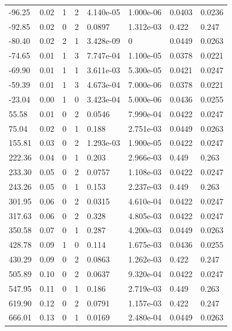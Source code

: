 \documentclass[preview]{standalone}
\begin{document}
{{\begin{tabular}{L{1.2cm}C{1.2cm} C{0.3cm}C{0.5cm} C{1.4cm}C{1.4cm} C{1.4cm}C{1.4cm}}
  -96.25  &  0.02  & 1     &  2 &  4.140e-05  & 1.000e-06  & 0.0403 &  0.0236   \\ 
  -92.85  &  0.02  & 0     &  2 &  0.0897  & 1.312e-03  & 0.422 &  0.247   \\ 
  -80.40  &  0.02  & 2     &  1 &  3.428e-09  & 0  & 0.0449 &  0.0263   \\ 
  -74.65  &  0.01  & 1     &  3 &  7.747e-04  & 1.100e-05  & 0.0378 &  0.0221   \\ 
  -69.90  &  0.01  & 1     &  1 &  3.611e-03  & 5.300e-05  & 0.0421 &  0.0247   \\ 
  -59.39  &  0.01  & 1     &  3 &  4.673e-04  & 7.000e-06  & 0.0378 &  0.0221   \\ 
  -23.04  &  0.00  & 1     &  0 &  3.423e-04  & 5.000e-06  & 0.0436 &  0.0255   \\ 
  55.58  &  0.01  & 0     &  2 &  0.0546  & 7.990e-04  & 0.0422 &  0.0247   \\ 
  75.04  &  0.02  & 0     &  1 &  0.188  & 2.751e-03  & 0.0449 &  0.0263   \\ 
  155.81  &  0.03  & 0     &  2 &  1.293e-03  & 1.900e-05  & 0.0422 &  0.0247   \\ 
  222.36  &  0.04  & 0     &  1 &  0.203  & 2.966e-03  & 0.449 &  0.263   \\ 
  233.30  &  0.05  & 0     &  2 &  0.0757  & 1.108e-03  & 0.0422 &  0.0247   \\ 
  243.26  &  0.05  & 0     &  1 &  0.153  & 2.237e-03  & 0.449 &  0.263   \\ 
  301.95  &  0.06  & 0     &  2 &  0.0315  & 4.610e-04  & 0.0422 &  0.0247   \\ 
  317.63  &  0.06  & 0     &  2 &  0.328  & 4.805e-03  & 0.0422 &  0.0247   \\ 
  350.58  &  0.07  & 0     &  1 &  0.287  & 4.200e-03  & 0.0449 &  0.0263   \\ 
  428.78  &  0.09  & 1     &  0 &  0.114  & 1.675e-03  & 0.0436 &  0.0255   \\ 
  430.29  &  0.09  & 0     &  2 &  0.0863  & 1.262e-03  & 0.422 &  0.247   \\ 
  505.89  &  0.10  & 0     &  2 &  0.0637  & 9.320e-04  & 0.0422 &  0.0247   \\ 
  547.95  &  0.11  & 0     &  1 &  0.186  & 2.719e-03  & 0.449 &  0.263   \\ 
  619.90  &  0.12  & 0     &  2 &  0.0791  & 1.157e-03  & 0.422 &  0.247   \\ 
  666.01  &  0.13  & 0     &  1 &  0.0169  & 2.480e-04  & 0.0449 &  0.0263   \\ 

\end{tabular}}}
\end{document}

